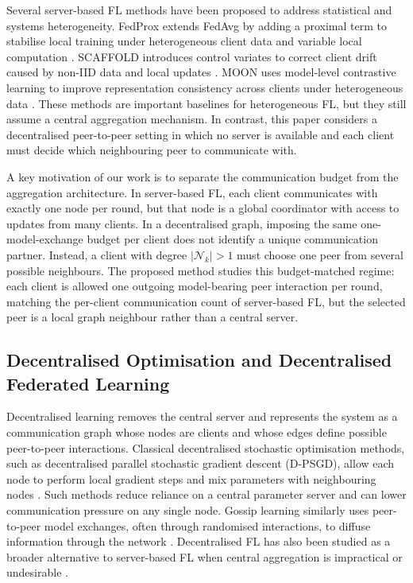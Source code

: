 \documentclass[conference]{IEEEtran}
\begin{document}
Several server-based FL methods have been proposed to address statistical and systems heterogeneity. FedProx extends FedAvg by adding a proximal term to stabilise local training under heterogeneous client data and variable local computation \cite{li2020fedprox}. SCAFFOLD introduces control variates to correct client drift caused by non-IID data and local updates \cite{karimireddy2020scaffold}. MOON uses model-level contrastive learning to improve representation consistency across clients under heterogeneous data \cite{li2021moon}. These methods are important baselines for heterogeneous FL, but they still assume a central aggregation mechanism. In contrast, this paper considers a decentralised peer-to-peer setting in which no server is available and each client must decide which neighbouring peer to communicate with.

A key motivation of our work is to separate the communication budget from the aggregation architecture. In server-based FL, each client communicates with exactly one node per round, but that node is a global coordinator with access to updates from many clients. In a decentralised graph, imposing the same one-model-exchange budget per client does not identify a unique communication partner. Instead, a client with degree $|\mathcal{N}_k|>1$ must choose one peer from several possible neighbours. The proposed method studies this budget-matched regime: each client is allowed one outgoing model-bearing peer interaction per round, matching the per-client communication count of server-based FL, but the selected peer is a local graph neighbour rather than a central server.


\subsection{Decentralised Optimisation and Decentralised Federated Learning}
\label{subsec:decentralised-optimisation-and-decentralised-feder}
Decentralised learning removes the central server and represents the system as a communication graph whose nodes are clients and whose edges define possible peer-to-peer interactions. Classical decentralised stochastic optimisation methods, such as decentralised parallel stochastic gradient descent (D-PSGD), allow each node to perform local gradient steps and mix parameters with neighbouring nodes \cite{lian2017decentralized}. Such methods reduce reliance on a central parameter server and can lower communication pressure on any single node. Gossip learning similarly uses peer-to-peer model exchanges, often through randomised interactions, to diffuse information through the network \cite{ormandi2013gossip,hegedus2019gossip}. Decentralised FL has also been studied as a broader alternative to server-based FL when central aggregation is impractical or undesirable \cite{yuan2023decentralized}.
\end{document}
